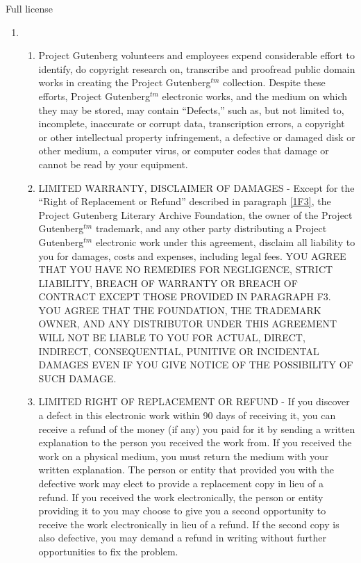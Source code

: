 \begin{chapter}{Full license}
\begin{enumerate}
\item
\begin{enumerate}
\item Project Gutenberg volunteers and employees expend considerable
effort to identify, do copyright research on, transcribe and proofread
public domain works in creating the Project Gutenberg$^{tm}$
collection.  Despite these efforts, Project Gutenberg$^{tm}$ electronic
works, and the medium on which they may be stored, may contain
``Defects,'' such as, but not limited to, incomplete, inaccurate or
corrupt data, transcription errors, a copyright or other intellectual
property infringement, a defective or damaged disk or other medium, a
computer virus, or computer codes that damage or cannot be read by
your equipment.

\item LIMITED WARRANTY, DISCLAIMER OF DAMAGES - Except for the ``Right
of Replacement or Refund'' described in paragraph \ref{1F3}, the Project
Gutenberg Literary Archive Foundation, the owner of the Project
Gutenberg$^{tm}$ trademark, and any other party distributing a Project
Gutenberg$^{tm}$ electronic work under this agreement, disclaim all
liability to you for damages, costs and expenses, including legal
fees.  YOU AGREE THAT YOU HAVE NO REMEDIES FOR NEGLIGENCE, STRICT
LIABILITY, BREACH OF WARRANTY OR BREACH OF CONTRACT EXCEPT THOSE
PROVIDED IN PARAGRAPH F3.  YOU AGREE THAT THE FOUNDATION, THE
TRADEMARK OWNER, AND ANY DISTRIBUTOR UNDER THIS AGREEMENT WILL NOT BE
LIABLE TO YOU FOR ACTUAL, DIRECT, INDIRECT, CONSEQUENTIAL, PUNITIVE OR
INCIDENTAL DAMAGES EVEN IF YOU GIVE NOTICE OF THE POSSIBILITY OF SUCH
DAMAGE.

\item \label{1F3}LIMITED RIGHT OF REPLACEMENT OR REFUND - If you discover a
defect in this electronic work within 90 days of receiving it, you can
receive a refund of the money (if any) you paid for it by sending a
written explanation to the person you received the work from.  If you
received the work on a physical medium, you must return the medium with
your written explanation.  The person or entity that provided you with
the defective work may elect to provide a replacement copy in lieu of a
refund.  If you received the work electronically, the person or entity
providing it to you may choose to give you a second opportunity to
receive the work electronically in lieu of a refund.  If the second copy
is also defective, you may demand a refund in writing without further
opportunities to fix the problem.


\end{enumerate}
\end{enumerate}
\end{chapter}
